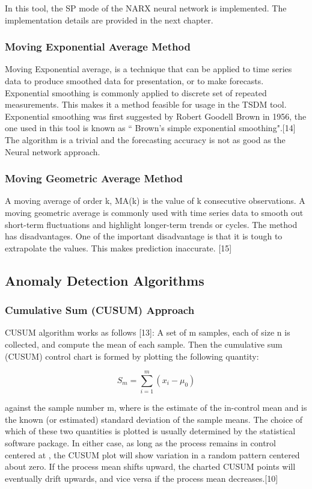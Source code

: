 \documentclass[12pt,a4paper]{report}
\begin{document}
In this tool, the SP mode of the NARX neural network is implemented. The implementation details are provided in the next chapter.
\subsubsection{Moving Exponential Average Method}
Moving Exponential average,  is a technique that can be applied to time series data to produce smoothed data for presentation, or to make forecasts. Exponential smoothing is commonly applied to discrete set of repeated measurements. This makes it a method feasible for usage in the TSDM tool. Exponential smoothing was first suggested by Robert Goodell Brown in 1956, the one used in this tool is known as `` Brown's simple exponential smoothing".[14]
The algorithm is a trivial and the forecasting accuracy is not as good as the Neural network approach.
\subsubsection{Moving Geometric Average Method}
A moving average of order k, MA(k) is the value of k consecutive observations. A moving geometric  average is commonly used with time series data to smooth out short-term fluctuations and highlight longer-term trends or cycles. The method has  disadvantages. One of the important  disadvantage is that it is tough to extrapolate the values. This makes prediction inaccurate. [15]
\subsection{Anomaly Detection Algorithms}
\subsubsection{Cumulative Sum (CUSUM) Approach}
CUSUM algorithm works as follows [13]: A set of  m samples, each of size n is collected, and compute the mean of each sample. Then the cumulative sum (CUSUM) control chart is formed by plotting the following quantity:

$$S_m= \sum_{i=1}^{m}(x_i- \mu_0)$$

against the sample number m, where   is the estimate of the in-control mean and   is the known (or estimated) standard deviation of the sample means. The choice of which of these two quantities is plotted is usually determined by the statistical software package. In either case, as long as the process remains in control centered at , the CUSUM plot will show variation in a random pattern centered about zero. If the process mean shifts upward, the charted CUSUM points will eventually drift upwards, and vice versa if the process mean decreases.[10]
\end{document}
